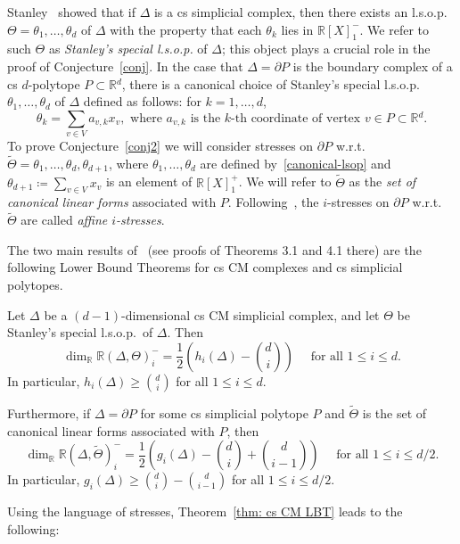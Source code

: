 \documentclass[ALCO,ThmDefs,Unicode,epreuves]{cedram}
\newcommand{\R}{\mathbb{R}{}}
\begin{document}
Stanley~\cite{Stanley-87} showed that if $\Delta$ is a cs simplicial complex, then there exists an l.s.o.p.~$\Theta=\theta_1,\ldots,\theta_d$ of $\Delta$ with the property that each $\theta_k$ lies in $\R[X]^-_1$. We refer to such $\Theta$ as \emph{Stanley's special l.s.o.p.} of $\Delta$; this object plays a crucial role in the proof of Conjecture~\ref{conj}. In the case that $\Delta=\partial P$ is the boundary complex of a cs $d$-polytope $P\subset \R^d$, there is a canonical choice of Stanley's special l.s.o.p.~$\theta_1, \dots, \theta_d$ of $\Delta$ defined as follows: for $k=1,\ldots,d$,
\begin{equation} \label{canonical-lsop}
\theta_k=\sum_{v\in V} a_{v,k}x_v, \mbox{ where $a_{v,k}$ is the $k$-th coordinate of vertex $v\in P\subset \R^d$}.
\end{equation}
To prove Conjecture~\ref{conj2} we will consider stresses on $\partial P$ w.r.t.~$\widetilde{\Theta}=\theta_1,\ldots,\theta_d,\theta_{d+1}$, where $\theta_1,\ldots,\theta_d$ are defined by~\eqref{canonical-lsop} and $\theta_{d+1}\coloneqq \sum_{v\in V} x_v$ is an element of $\R[X]^+_1$. We will refer to $\widetilde{\Theta}$ as the \emph{set of canonical linear forms} associated with $P$. Following~\cite{Lee96}, the $i$-stresses on $\partial P$ w.r.t.~$\widetilde{\Theta}$ are called \emph{affine $i$-stresses}.

The two main results of~\cite{Stanley-87} (see proofs of Theorems 3.1 and 4.1 there) are the following Lower Bound Theorems for cs CM complexes and cs simplicial polytopes. 
\begin{theorem}\label{thm: cs CM LBT} 
Let $\Delta$ be a $(d-1)$-dimensional cs CM simplicial complex, and let $\Theta$ be Stanley's special l.s.o.p.~of $\Delta$. Then $$\dim_\R \R(\Delta, \Theta)^-_i=\frac{1}{2}\left(h_i(\Delta)-\binom{d}{i}\right) \quad \mbox{ for all $1\leq i\leq d$}.$$ In particular, $h_i(\Delta)\geq \binom{d}{i}$ for all $1\leq i\leq d$. 

Furthermore, if $\Delta=\partial P$ for some cs simplicial polytope $P$ and $\widetilde{\Theta}$ is the set of canonical linear forms associated with $P$, then $$\dim_\R \R(\Delta, \widetilde{\Theta})^-_i=\frac{1}{2}\left(g_i(\Delta)-\binom{d}{i}+\binom{d}{i-1}\right) \quad \mbox{ for all $1\leq i\leq d/2$}.$$ In particular, $g_i(\Delta)\geq \binom{d}{i}-\binom{d}{i-1}$ for all $1\leq i\leq d/2$. 
\end{theorem}

Using the language of stresses, Theorem~\ref{thm: cs CM LBT} leads to the following:
\end{document}
